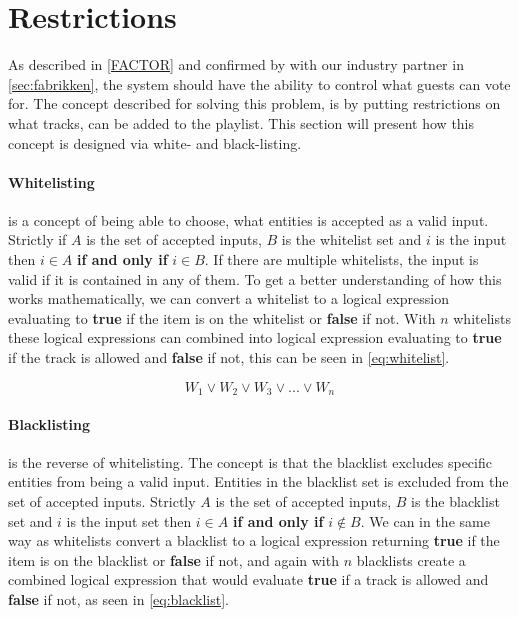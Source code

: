 \section{Restrictions}
\label{sec:restrictions}

As described in \cref{FACTOR} and confirmed by with our industry partner in \cref{sec:fabrikken}, the system should have the ability to control what guests can vote for. The concept described for solving this problem, is by putting restrictions on what tracks, can be added to the playlist. This section will present how this concept is designed via white- and black-listing.

\paragraph{Whitelisting} is a concept of being able to choose, what entities is accepted as a valid input. Strictly if $A$ is the set of accepted inputs, $B$ is the whitelist set and $i$ is the input then $i \in A$ \textbf{if and only if} $i \in B$. If there are multiple whitelists, the input is valid if it is contained in any of them.
To get a better understanding of how this works mathematically, we can convert a whitelist to a logical expression evaluating to \textbf{true} if the item is on the whitelist or \textbf{false} if not. With $n$ whitelists these logical expressions can combined into logical expression evaluating to \textbf{true} if the track is allowed and \textbf{false} if not, this can be seen in \cref{eq:whitelist}.

\begin{equation}
\label{eq:whitelist}
	W_1 \vee W_2 \vee W_3 \vee ... \vee W_n
\end{equation}

\paragraph{Blacklisting} is the reverse of whitelisting. The concept is that the blacklist excludes specific entities from being a valid input. Entities in the blacklist set is excluded from the set of accepted inputs. Strictly $A$ is the set of accepted inputs, $B$ is the blacklist set and $i$ is the input set then $i \in A$ \textbf{if and only if} $i \notin B$.
We can in the same way as whitelists convert a blacklist to a logical expression returning \textbf{true} if the item is on the blacklist or \textbf{false} if not, and again with $n$ blacklists create a combined logical expression that would evaluate \textbf{true} if a track is allowed and \textbf{false} if not, as seen in \cref{eq:blacklist}.

